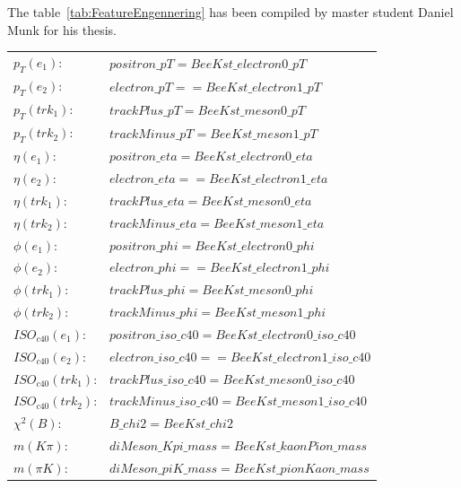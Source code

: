 The table~\ref{tab:FeatureEngennering} has been compiled by master student Daniel Munk for his thesis.

\begin{table}
  \begin{center}
    \footnotesize%
    \begin{tabular}{lm{11.9cm}}
      \toprule
$p_T(e_1)$: & $positron\_pT  = BeeKst\_electron0\_pT$\\
$p_T(e_2)$: & $electron\_pT =    = BeeKst\_electron1\_pT$\\
$p_T(trk_1)$: & $trackPlus\_pT  = BeeKst\_meson0\_pT$\\
$p_T(trk_2)$: &  $trackMinus\_pT = BeeKst\_meson1\_pT$\\

$\eta(e_1)$: & $positron\_eta  = BeeKst\_electron0\_eta$\\
$\eta(e_2)$: & $electron\_eta =    = BeeKst\_electron1\_eta$\\
$\eta(trk_1)$: & $trackPlus\_eta  = BeeKst\_meson0\_eta$\\
$\eta(trk_2)$: &  $trackMinus\_eta = BeeKst\_meson1\_eta$\\

$\phi(e_1)$: & $positron\_phi  = BeeKst\_electron0\_phi$\\
$\phi(e_2)$: & $electron\_phi =    = BeeKst\_electron1\_phi$\\
$\phi(trk_1)$: & $trackPlus\_phi  = BeeKst\_meson0\_phi$\\
$\phi(trk_2)$: &  $trackMinus\_phi = BeeKst\_meson1\_phi$\\

$ISO_{c40}(e_1)$: & $positron\_iso\_c40  = BeeKst\_electron0\_iso\_c40$\\
$ISO_{c40}(e_2)$: & $electron\_iso\_c40 =    = BeeKst\_electron1\_iso\_c40$\\
$ISO_{c40}(trk_1)$: & $trackPlus\_iso\_c40  = BeeKst\_meson0\_iso\_c40$\\
$ISO_{c40}(trk_2)$: &  $trackMinus\_iso\_c40 = BeeKst\_meson1\_iso\_c40$\\

$\chi^2(B)$: & $B\_chi2 = BeeKst\_chi2$\\

$m(K\pi)$: & $diMeson\_Kpi\_mass  = BeeKst\_kaonPion\_mass$\\
$m(\pi K)$: & $diMeson\_piK\_mass = BeeKst\_pionKaon\_mass$\\


\end{tabular}
\end{center}
\end{table}
